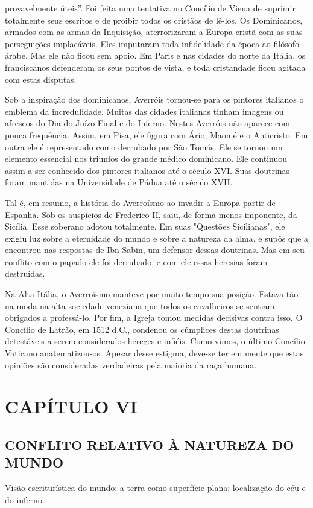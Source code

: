 \documentclass[11pt,a5paper,twoside,openany]{book}
\begin{document}
provavelmente úteis”. Foi feita uma tentativa no Concílio de Viena de suprimir totalmente seus escritos e de proibir todos os cristãos de lê-los. Os Dominicanos, armados com as armas da Inquisição, aterrorizaram a Europa cristã com as suas perseguições implacáveis. Eles imputaram toda infidelidade da época ao filósofo árabe. Mas ele não ficou sem apoio. Em Paris e nas cidades do norte da Itália, os franciscanos defenderam os seus pontos de vista, e toda cristandade ficou agitada com estas disputas.

Sob a inspiração dos dominicanos, Averróis tornou-se para os pintores italianos o emblema da incredulidade. Muitas das cidades italianas tinham imagens ou afrescos do Dia do Juízo Final e do Inferno. Nestes Averróis não aparece com pouca frequência. Assim, em Pisa, ele figura com Ário, Maomé e o Anticristo. Em outra ele é representado como derrubado por São Tomás. Ele se tornou um elemento essencial nos triunfos do grande médico dominicano. Ele continuou assim a ser conhecido dos pintores italianos até o século XVI. Suas doutrinas foram mantidas na Universidade de Pádua até o século XVII.

Tal é, em resumo, a história do Averroísmo ao invadir a Europa partir de Espanha. Sob os auspícios de Frederico II, saiu, de forma menos imponente, da Sicília. Esse soberano adotou totalmente. Em suas "Questões Sicilianas", ele exigiu luz sobre a eternidade do mundo e sobre a natureza da alma, e supôs que a encontrou nas respostas de Ibn Sabin, um defensor dessas doutrinas. Mas em seu conflito com o papado ele foi derrubado, e com ele essas heresias foram destruídas.

Na Alta Itália, o Averroísmo manteve por muito tempo sua posição. Estava tão na moda na alta sociedade veneziana que todos os cavalheiros se sentiam obrigados a professá-lo. Por fim, a Igreja tomou medidas decisivas contra isso. O Concílio de Latrão, em 1512 d.C., condenou os cúmplices destas doutrinas detestáveis ​​a serem considerados hereges e infiéis. Como vimos, o último Concílio Vaticano anatematizou-os. Apesar desse estigma, deve-se ter em mente que estas opiniões são consideradas verdadeiras pela maioria da raça humana.

\clearpage
\chapter*{CAPÍTULO VI}
\section*{CONFLITO RELATIVO À NATUREZA DO MUNDO}
Visão escriturística do mundo: a terra como superfície plana; localização do céu e do inferno.
\end{document}
